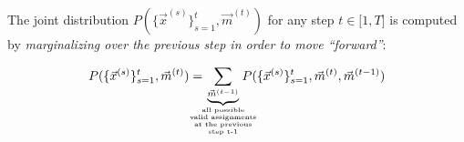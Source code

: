 \begin{frame}{\subsecname}

The joint distribution $P(\{\vec x^{(s)}\}_{s=1}^t, \vec m^{(t)})$ for any step $t \in \lbrack 1, T\rbrack$ is computed by \textit{marginalizing over the previous step in order to move ``forward''}:

\begin{equation}
P(\{\vec x^{(s)}\}_{s=1}^t, \vec m^{(t)})
=
\kern-3ex
\underbrace{
\sum_{\vec m^{(t-1)}}
}_{
\substack{
\text{\tiny all possible}\\
\text{\tiny valid assignments}\\
\text{\tiny at the previous}\\
\text{\tiny step t-1}
}
}
\kern-3ex
P(\{\vec x^{(s)}\}_{s=1}^t, \vec m^{(t)}, \vec m^{(t-1)})
\end{equation}

\end{frame}

